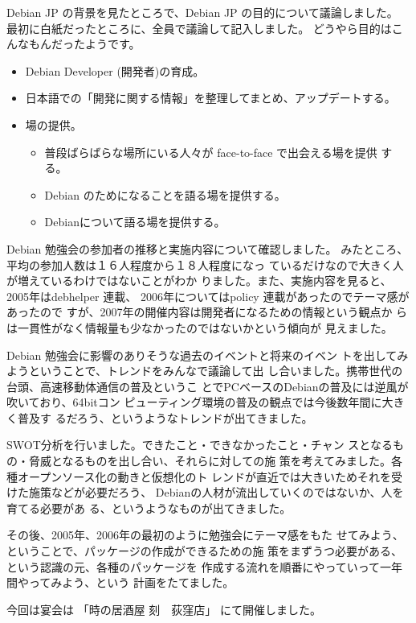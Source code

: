 \documentclass[mingoth,a4paper]{jsarticle}
\begin{document}
Debian JP の背景を見たところで、Debian JP の目的について議論しました。
最初に白紙だったところに、全員で議論して記入しました。
どうやら目的はこんなもんだったようです。


\begin{itemize}
 \item Debian Developer (開発者)の育成。
 \item 日本語での「開発に関する情報」を整理してまとめ、アップデートする。
 \item 場の提供。
 \begin{itemize}
  \item 普段ばらばらな場所にいる人々が face-to-face で出会える場を提供
	する。
  \item Debian のためになることを語る場を提供する。
  \item Debianについて語る場を提供する。
 \end{itemize}
\end{itemize}		
	      
Debian 勉強会の参加者の推移と実施内容について確認しました。
みたところ、平均の参加人数は１６人程度から１８人程度になっ
ているだけなので大きく人が増えているわけではないことがわか
りました。また、実施内容を見ると、2005年はdebhelper 連載、
2006年についてはpolicy 連載があったのでテーマ感があったので
すが、2007年の開催内容は開発者になるための情報という観点か
らは一貫性がなく情報量も少なかったのではないかという傾向が
見えました。


Debian 勉強会に影響のありそうな過去のイベントと将来のイベン
トを出してみようということで、トレンドをみんなで議論して出
し合いました。携帯世代の台頭、高速移動体通信の普及というこ
とでPCベースのDebianの普及には逆風が吹いており、64bitコン
ピューティング環境の普及の観点では今後数年間に大きく普及す
るだろう、というようなトレンドが出てきました。


SWOT分析を行いました。できたこと・できなかったこと・チャン
スとなるもの・脅威となるものを出し合い、それらに対しての施
策を考えてみました。各種オープンソース化の動きと仮想化のト
レンドが直近では大きいためそれを受けた施策などが必要だろう、
Debianの人材が流出していくのではないか、人を育てる必要があ
る、というようなものが出てきました。


その後、2005年、2006年の最初のように勉強会にテーマ感をもた
せてみよう、ということで、パッケージの作成ができるための施
策をまずうつ必要がある、という認識の元、各種のパッケージを
作成する流れを順番にやっていって一年間やってみよう、という
計画をたてました。


今回は宴会は	    
「時の居酒屋  刻　荻窪店」
にて開催しました。
\end{document}
